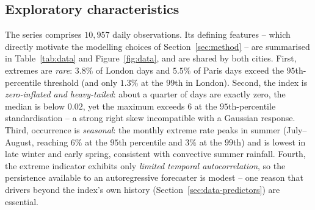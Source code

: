 \documentclass[11pt,a4paper]{article}
\begin{document}
\subsection{Exploratory characteristics}\label{sec:data-eda}
The series comprises $10{,}957$ daily observations. Its defining features --
which directly motivate the modelling choices of Section~\ref{sec:method} --
are summarised in Table~\ref{tab:data} and Figure~\ref{fig:data}, and are shared
by both cities. First, extremes are \emph{rare}: $3.8\%$ of London days and
$5.5\%$ of Paris days exceed the $95$th-percentile threshold (and only $1.3\%$ at
the $99$th in London). Second, the index is
\emph{zero-inflated and heavy-tailed}: about a quarter of days are exactly zero,
the median is below $0.02$, yet the maximum exceeds $6$ at the $95$th-percentile
standardisation -- a strong right skew incompatible with a Gaussian response.
Third, occurrence is \emph{seasonal}: the monthly extreme rate peaks in summer
(July--August, reaching $6\%$ at the $95$th percentile and $3\%$ at the $99$th)
and is lowest in late winter and early spring, consistent with convective
summer rainfall. Fourth, the extreme indicator exhibits only \emph{limited
temporal autocorrelation}, so the persistence available to an autoregressive
forecaster is modest -- one reason that drivers beyond the index's own history
(Section~\ref{sec:data-predictors}) are essential.
\end{document}
